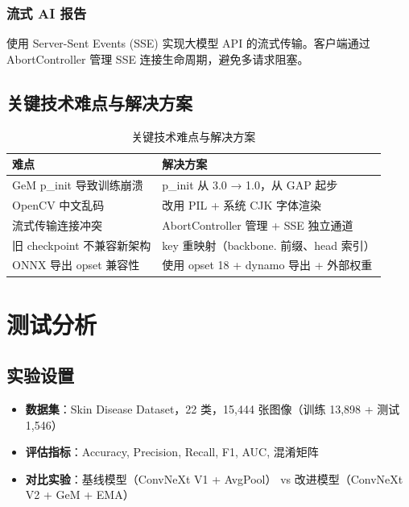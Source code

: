 \documentclass[12pt,a4paper]{report}
\begin{document}
\subsection{流式 AI 报告}

使用 Server-Sent Events (SSE) 实现大模型 API 的流式传输。客户端通过 AbortController 管理 SSE 连接生命周期，避免多请求阻塞。

\section{关键技术难点与解决方案}

\begin{table}[H]
    \centering
    \caption{关键技术难点与解决方案}
    \label{tab:challenges}
    \begin{tabularx}{\linewidth}{l X}
        \toprule
        \textbf{难点} & \textbf{解决方案} \\
        \midrule
        GeM p\_init 导致训练崩溃 & p\_init 从 3.0 → 1.0，从 GAP 起步 \\
        OpenCV 中文乱码 & 改用 PIL + 系统 CJK 字体渲染 \\
        流式传输连接冲突 & AbortController 管理 + SSE 独立通道 \\
        旧 checkpoint 不兼容新架构 & key 重映射（backbone. 前缀、head 索引） \\
        ONNX 导出 opset 兼容性 & 使用 opset 18 + dynamo 导出 + 外部权重 \\
        \bottomrule
    \end{tabularx}
\end{table}

\chapter{测试分析}

\section{实验设置}

\begin{itemize}[leftmargin=2em, itemsep=0.3em]
    \item \textbf{数据集}：Skin Disease Dataset，22 类，15,444 张图像（训练 13,898 + 测试 1,546）
    \item \textbf{评估指标}：Accuracy, Precision, Recall, F1, AUC, 混淆矩阵
    \item \textbf{对比实验}：基线模型（ConvNeXt V1 + AvgPool） vs 改进模型（ConvNeXt V2 + GeM + EMA）
\end{itemize}
\end{document}
